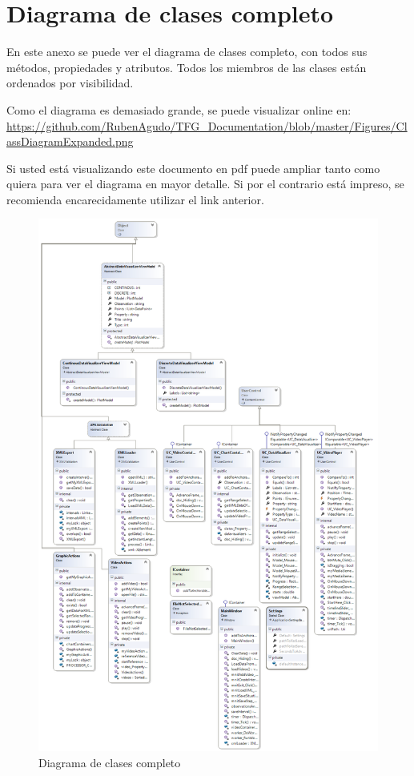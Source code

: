 \chapter{Diagrama de clases completo}
\label{chap:DiagramaDeClasesCompleto}
En este anexo se puede ver el diagrama de clases completo,
con todos sus m\'etodos, propiedades y atributos. Todos los miembros
de las clases est\'an ordenados por visibilidad.

Como el diagrama es demasiado grande, se puede visualizar online en:
\url{https://github.com/RubenAgudo/TFG_Documentation/blob/master/Figures/ClassDiagramExpanded.png}

Si usted est\'a visualizando este documento en pdf puede ampliar tanto como quiera
para ver el diagrama en mayor detalle. Si por el contrario est\'a impreso,
se recomienda encarecidamente utilizar el link anterior.

\cleardoublepage

\begin{figure}[h]
\centering
\includegraphics[width=0.9\linewidth]{./Figures/ClassDiagramExpanded}
\caption{Diagrama de clases completo}
\label{fig:ClassDiagramExpanded}
\end{figure}
